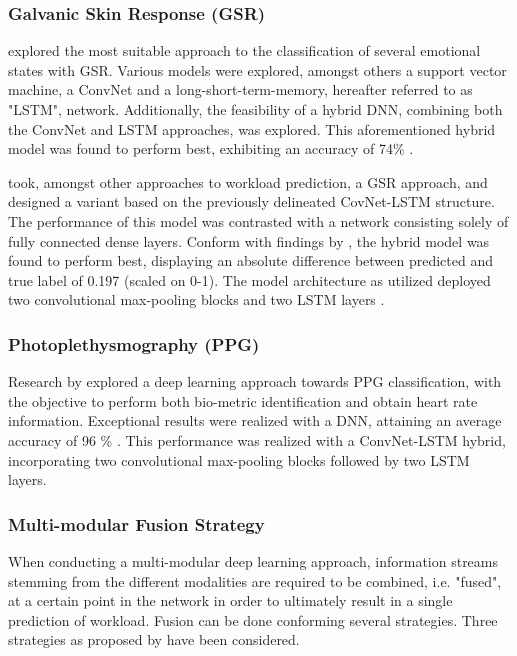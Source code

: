 \documentclass[12pt]{article}
\begin{document}
\subsubsection{Galvanic Skin Response (GSR)}
 explored the most suitable approach to the classification of several emotional states with GSR. Various models were explored, amongst others a support vector machine, a ConvNet and a long-short-term-memory, hereafter referred to as "LSTM", network. Additionally, the feasibility of a hybrid DNN, combining both the ConvNet and LSTM approaches, was explored. This aforementioned hybrid model was found to perform best, exhibiting an accuracy of 74\% \cite{sun2019hybrid}. 

 took, amongst other approaches to workload prediction,  a GSR approach, and designed a variant based on the previously delineated CovNet-LSTM structure. The performance of this model was contrasted with a network consisting solely of fully connected dense layers. Conform with findings by  , the hybrid model was found to perform best, displaying an absolute difference between predicted and true label of 0.197 (scaled on 0-1). The model architecture as utilized deployed two convolutional max-pooling blocks and two LSTM layers \cite{dolmans2020perceived}.

\subsubsection{Photoplethysmography (PPG)}
Research by  explored a deep learning approach towards PPG classification, with the objective to perform both bio-metric identification and obtain heart rate information. Exceptional results were realized with a DNN, attaining an average accuracy of 96 \% \cite{biswas2019cornet}. This performance was realized with a ConvNet-LSTM hybrid, incorporating two convolutional max-pooling blocks followed by two LSTM layers. 

\subsubsection{Multi-modular Fusion Strategy}  
When conducting a multi-modular deep learning approach,  information streams stemming from the different modalities are required to be combined, i.e. "fused", at a certain point in the network in order to ultimately result in a single prediction of workload. Fusion can be done conforming several strategies. Three strategies as proposed by  have been considered.
\end{document}
